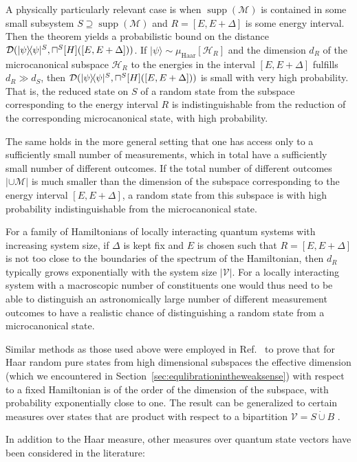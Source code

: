 \documentclass[a4paper,12pt,listof=totoc,index=totoc,bibliography=totoc,headsepline=false,headings=normal,BCOR16.153846mm,DIV12,headinclude,twoside,cleardoublepage=empty,numbers=noenddot,final]{scrreprt}
\theoremstyle{mystyle}
\numberwithin{equation}{section}
\numberwithin{figure}{section}
\numberwithin{lemma}{section}
\numberwithin{theorem}{section}
\numberwithin{corollary}{section}
\numberwithin{definition}{section}
\numberwithin{conjecture}{section}
\numberwithin{observation}{section}
\newcommand{\+}{\mkern2mu}
\newcommand{\union}{\cup}
\newcommand{\dunion}{\mathbin{\dot{\cup}}}
\renewcommand{\H}{H}
\newcommand{\rhomc}{{\sqcap}}
\newcommand{\muhaar}{\mu_{\mathrm{Haar}}}
\newcommand{\Vset}{\mathcal{V}}
\newcommand{\bra}[1]{\langle #1|}
\newcommand{\ket}[1]{|#1\rangle}
\newcommand{\ketbra}[2]{\ket{#1}\!\bra{#2}}
\newcommand{\tracedistance}[3][]{
  \ifthenelse{\equal{#2}{}}
  {\ifthenelse{\equal{#3}{}}
    {\mathcal{D}_{#1}}{}
  }{
    \ifthenelse{\equal{#1}{}}
    {\operatorname{\mathcal{D}}(#2,#3)}
    {\operatorname{\mathcal{D}}_{#1}(#2,#3)}
  }
}
\DeclareMathOperator{\1}{\mathds{1}}
\newcommand{\POVMs}{\mathcal{M}}
\DeclareMathOperator{\supp}{supp}
\newcommand{\mc}[1]{\mathcal{#1}}
\newcommand{\mcH}{\mc{H}}
\begin{document}
A physically particularly relevant case is when $\supp(\POVMs)$ is contained in some small subsystem $S \supseteq \supp(\POVMs)$ and $R = [E,E+\Delta]$ is some energy interval.
Then the theorem yields a probabilistic bound on the distance $\tracedistance{\ketbra\psi\psi^S}{\rhomc^S[\H]([E,E+\Delta])}$.
If $\ket\psi\sim\muhaar[\mcH_R]$ and the dimension $d_R$ of the microcanonical subspace $\mcH_R$ to the energies in the interval $[E,E+\Delta]$ fulfills $d_R \gg d_S$, then $\tracedistance{\ketbra\psi\psi^S}{\rhomc^S[\H]([E,E+\Delta])}$ is small with very high probability.
That is, the reduced state on $S$ of a random state from the subspace corresponding to the energy interval $R$ is indistinguishable from the reduction of the corresponding microcanonical state, with high probability.

The same holds in the more general setting that one has access only to a sufficiently small number of measurements, which in total have a sufficiently small number of different outcomes.
If the total number of different outcomes $|\union \POVMs|$ is much smaller than the dimension of the subspace corresponding to the energy interval $[E,E+\Delta]$, a random state from this subspace is with high probability indistinguishable from the microcanonical state.

For a family of Hamiltonians of locally interacting quantum systems with increasing system size, if $\Delta$ is kept fix and $E$ is chosen such that $R = [E,E+\Delta]$ is not too close to the boundaries of the spectrum of the Hamiltonian, then $d_R$ typically grows exponentially with the system size $|\Vset|$.
For a locally interacting system with a macroscopic number of constituents one would thus need to be able to distinguish an astronomically large number of different measurement outcomes to have a realistic chance of distinguishing a random state from a microcanonical state.

Similar methods as those used above were employed in Ref.~\cite{Linden09} to prove that for Haar random pure states from high dimensional subspaces the effective dimension (which we encountered in Section~\ref{sec:equlibrationintheweaksense}) with respect to a fixed Hamiltonian is of the order of the dimension of the subspace, with probability exponentially close to one.
The result can be generalized to certain measures over states that are product with respect to a bipartition $\Vset = S \dunion B$ \cite{Gogolin10-masterthesis}.

In addition to the Haar measure, other measures over quantum state vectors have been considered in the literature:
\end{document}
